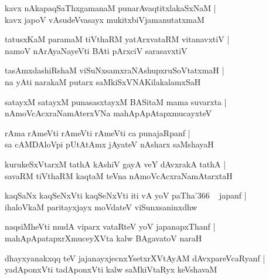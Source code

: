 \documentclass[twoside,12pt,openright]{book}
\newcounter{shloka}[chapter]
\begin{document}
\begin{shloka}%
kavx nAkapaqSaThxgamanaM punarAvaqtitxlakaSxNaM |\\
kavx japoV vAsudeVvasayx mukitxbiVjamanutatxmaM 
\end{shloka}

\begin{shloka}%
tatusxKaM paramaM tiVthaRM yatArxvataRM vitanavxtiV |\\
namoV nArAyaNayeVti BAti pArxciV sarasavxtiV 
\end{shloka}

\begin{shloka}%
tasAmxdashiRshaM viSuNxsamxraNAshupxruSoVtatxmaH |\\
na yAti narakaM putarx saMkiSxVNAKilakalamxSaH 
\end{shloka}

\begin{shloka}%
satayxM satayxM punasasxtayxM BASitaM mama suvarxta |\\
nAmoVcAcxraNamAterxVNa mahApApAtapxmucayxteV 
\end{shloka}

\begin{shloka}%
rAma rAmeVti rAmeVti rAmeVti ca punajaRpanf |\\
sa cAMDAloVpi pUtAtAmx jAyateV nAsharx saMshayaH 
\end{shloka}

\begin{shloka}%
kurukeSxVtarxM tathA kAshiV gayA veY dAvxrakA tathA |\\
savaRM tiVthaRM kaqtaM teVna nAmoVcAcxraNamAtarxtaH 
\end{shloka}

\begin{shloka}%
kaqSaNx kaqSeNxVti kaqSeNxVti iti vA yoV paTha\char'366 ~ japanf |\\
ihaloVkaM paritayxjayx moVdateV viSunxsaninxdhw 
\end{shloka}

\begin{shloka}%
naqsiMheVti mudA viparx vataRteV yoV japanapxThanf |\\
mahApApatapxrXmuceyXVta kalw BAgavatoV naraH 
\end{shloka}

\begin{shloka}%
dhayxyanakxqq teV jajanayxjecnxYsetxrXVtAyAM dAvxpareVcaRyanf |\\
yadAponxVti tadAponxVti kalw saMkiVtaRyx keVshavaM 
\end{shloka}
\end{document}
